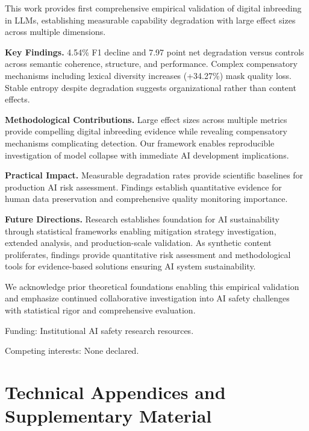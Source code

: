 \documentclass{article}
\begin{document}
This work provides first comprehensive empirical validation of digital inbreeding in LLMs, establishing measurable capability degradation with large effect sizes across multiple dimensions.

\textbf{Key Findings.} 4.54\% F1 decline and 7.97 point net degradation versus controls across semantic coherence, structure, and performance. Complex compensatory mechanisms including lexical diversity increases (+34.27\%) mask quality loss. Stable entropy despite degradation suggests organizational rather than content effects.

\textbf{Methodological Contributions.} Large effect sizes across multiple metrics provide compelling digital inbreeding evidence while revealing compensatory mechanisms complicating detection. Our framework enables reproducible investigation of model collapse with immediate AI development implications.

\textbf{Practical Impact.} Measurable degradation rates provide scientific baselines for production AI risk assessment. Findings establish quantitative evidence for human data preservation and comprehensive quality monitoring importance.

\textbf{Future Directions.} Research establishes foundation for AI sustainability through statistical frameworks enabling mitigation strategy investigation, extended analysis, and production-scale validation. As synthetic content proliferates, findings provide quantitative risk assessment and methodological tools for evidence-based solutions ensuring AI system sustainability.

\begin{ack}
We acknowledge prior theoretical foundations enabling this empirical validation and emphasize continued collaborative investigation into AI safety challenges with statistical rigor and comprehensive evaluation.

Funding: Institutional AI safety research resources.

Competing interests: None declared.
\end{ack}




\appendix

\section*{Technical Appendices and Supplementary Material}
\end{document}
